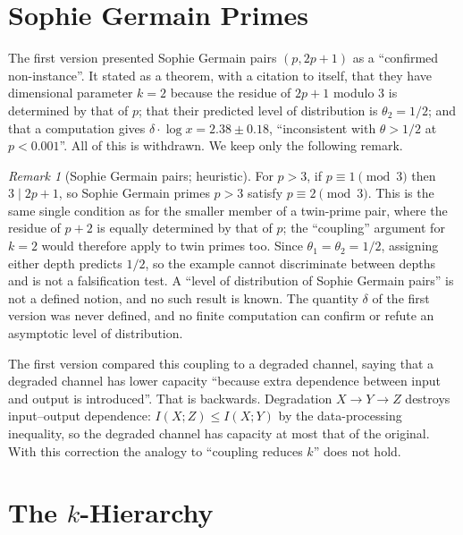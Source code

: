\documentclass[12pt]{amsart}
\theoremstyle{plain}
\theoremstyle{definition}
\theoremstyle{remark}
\newtheorem{remark}[theorem]{Remark}
\begin{document}
\section{Sophie Germain Primes}
\label{sec:sg}

The first version presented Sophie Germain pairs $(p, 2p+1)$ as a ``confirmed
non-instance''. It stated as a theorem, with a citation to itself, that they have
dimensional parameter $k = 2$ because the residue of $2p+1$ modulo $3$ is
determined by that of $p$; that their predicted level of distribution is
$\theta_2 = 1/2$; and that a computation gives
$\delta \cdot \log x = 2.38 \pm 0.18$, ``inconsistent with $\theta > 1/2$ at
$p < 0.001$''. All of this is withdrawn. We keep only the following remark.

\begin{remark}[Sophie Germain pairs; heuristic]
\label{rem:sg}
For $p > 3$, if $p \equiv 1 \pmod{3}$ then $3 \mid 2p+1$, so Sophie Germain
primes $p > 3$ satisfy $p \equiv 2 \pmod{3}$. This is the same single condition
as for the smaller member of a twin-prime pair, where the residue of $p+2$ is
equally determined by that of $p$; the ``coupling'' argument for $k = 2$ would
therefore apply to twin primes too. Since $\theta_1 = \theta_2 = 1/2$, assigning
either depth predicts $1/2$, so the example cannot discriminate between depths
and is not a falsification test. A ``level of distribution of Sophie Germain
pairs'' is not a defined notion, and no such result is known. The quantity
$\delta$ of the first version was never defined, and no finite computation can
confirm or refute an asymptotic level of distribution.
\end{remark}

The first version compared this coupling to a degraded channel, saying that a
degraded channel has lower capacity ``because extra dependence between input and
output is introduced''. That is backwards. Degradation $X \to Y \to Z$ destroys
input--output dependence: $I(X;Z) \leq I(X;Y)$ by the data-processing
inequality, so the degraded channel has capacity at most that of the original.
With this correction the analogy to ``coupling reduces $k$'' does not hold.

\section{The $k$-Hierarchy}
\label{sec:hierarchy}
\end{document}
